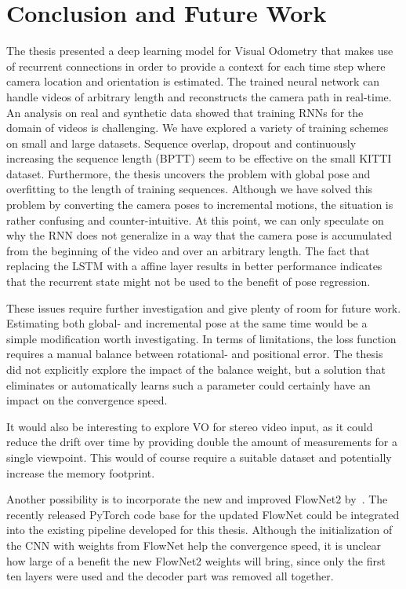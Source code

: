 \chapter{Conclusion and Future Work}

The thesis presented a deep learning model for Visual Odometry that makes use of recurrent connections in order to provide a context for each time step where camera location and orientation is estimated.
The trained neural network can handle videos of arbitrary length and reconstructs the camera path in real-time.
An analysis on real and synthetic data showed that training RNNs for the domain of videos is challenging.
We have explored a variety of training schemes on small and large datasets.
Sequence overlap, dropout and continuously increasing the sequence length (BPTT) seem to be effective on the small KITTI dataset.
Furthermore, the thesis uncovers the problem with global pose and overfitting to the length of training sequences.
Although we have solved this problem by converting the camera poses to incremental motions, the situation is rather confusing and counter-intuitive.
At this point, we can only speculate on why the RNN does not generalize in a way that the camera pose is accumulated from the beginning of the video and over an arbitrary length.
The fact that replacing the LSTM with a affine layer results in better performance indicates that the recurrent state might not be used to the benefit of pose regression.

These issues require further investigation and give plenty of room for future work.
Estimating both global- and incremental pose at the same time would be a simple modification worth investigating.
In terms of limitations, the loss function requires a manual balance between rotational- and positional error.
The thesis did not explicitly explore the impact of the balance weight, but a solution that eliminates or automatically learns such a parameter could certainly have an impact on the convergence speed.

It would also be interesting to explore VO for stereo video input, as it could reduce the drift over time by providing double the amount of measurements for a single viewpoint.
This would of course require a suitable dataset and potentially increase the memory footprint.

Another possibility is to incorporate the new and improved FlowNet2 by~\cite{ilg2016flownet}.
The recently released PyTorch code base for the updated FlowNet could be integrated into the existing pipeline developed for this thesis.
Although the initialization of the CNN with weights from FlowNet help the convergence speed, it is unclear how large of a benefit the new FlowNet2 weights will bring, since only the first ten layers were used and the decoder part was removed all together. 

